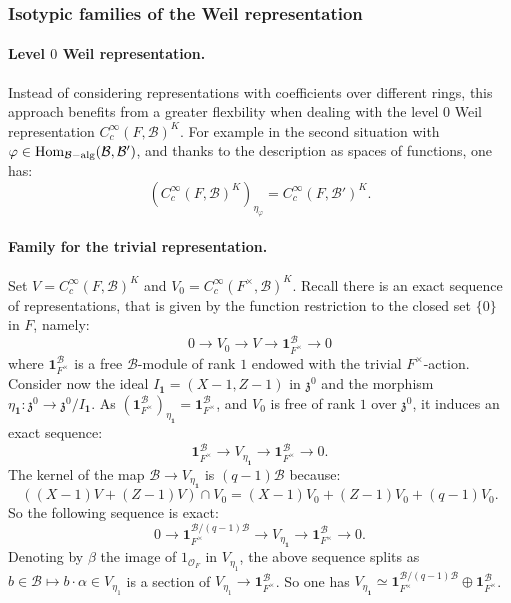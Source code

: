 \documentclass[11pt]{article}
\theoremstyle{plain}
\theoremstyle{definition}
\theoremstyle{plain}
\theoremstyle{definition}
\theoremstyle{plain}
\begin{document}
\subsubsection{Isotypic families of the Weil representation} \label{families_weil_rep_subsubsection}

\paragraph{Level $0$ Weil representation.} Instead of considering representations with coefficients over different rings, this approach benefits from a greater flexbility when dealing with the level $0$ Weil representation $C_c^\infty(F,\mathcal{B})^K$. For example in the second situation with $\varphi \in \textup{Hom}_{\mathcal{B}-\textup{alg}}( \mathcal{B}, \mathcal{B}')$, and thanks to the description as spaces of functions, one has:
$$(C_c^\infty(F,\mathcal{B})^K)_{\eta_\varphi} = C_c^\infty(F,\mathcal{B}')^K.$$

\paragraph{Family for the trivial representation.} Set $V = C_c^\infty(F,\mathcal{B})^K$ and $V_0 = C_c^\infty(F^\times,\mathcal{B})^K$. Recall there is an exact sequence of representations, that is given by the function restriction to the closed set $\{0\}$ in $F$, namely:
$$0 \to V_0 \to V \to \textbf{1}_{F^\times}^\mathcal{B} \to 0$$
where $\textbf{1}_{F^\times}^\mathcal{B}$ is a free $\mathcal{B}$-module of rank $1$ endowed with the trivial $F^\times$-action. Consider now the ideal $I_{\textbf{1}} =(X-1,Z-1)$ in $\mathfrak{z}^0$ and the morphism $\eta_{\textbf{1}} : \mathfrak{z}^0 \to \mathfrak{z}^0/I_{\textbf{1}}$. As $(\textbf{1}_{F^\times}^\mathcal{B})_{\eta_{\textbf{1}}} = \textbf{1}_{F^\times}^\mathcal{B}$, and $V_0$ is free of rank $1$ over $\mathfrak{z}^0$, it induces an exact sequence:
$$\textbf{1}_{F^\times}^\mathcal{B} \to V_{\eta_{\textbf{1}}} \to \textbf{1}_{F^\times}^\mathcal{B} \to 0.$$
The kernel of the map $\mathcal{B} \to V_{\eta_{\textbf{1}}}$ is $(q-1) \mathcal{B}$ because:
$$((X-1) V +(Z-1) V )\cap V_0 = (X-1)V_0 + (Z-1) V_0 + (q-1) V_0.$$
So the following sequence is exact:
$$0 \to \textbf{1}_{F^\times}^{\mathcal{B}/(q-1) \mathcal{B}} \to V_{\eta_{\textbf{1}}} \to \textbf{1}_{F^\times}^\mathcal{B} \to 0.$$
Denoting by $\beta$ the image of $1_{\mathcal{O}_F}$ in $V_{\eta_1}$, the above sequence splits as $b \in \mathcal{B} \mapsto b \cdot \alpha \in V_{\eta_1}$ is a section of $V_{\eta_1} \to \textbf{1}_{F^\times}^\mathcal{B}$. So one has $ V_{\eta_{\textbf{1}}} \simeq \textbf{1}_{F^\times}^{\mathcal{B}/(q-1) \mathcal{B}} \oplus \textbf{1}_{F^\times}^\mathcal{B}$.
\end{document}
